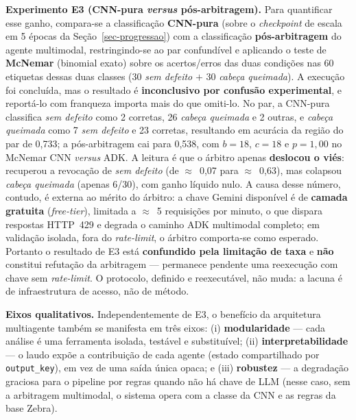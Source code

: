\documentclass[
	article,			%
	11pt,				%
	oneside,			%
	a4paper,			%
	english,			%
	brazilian,			%
	sumario=tradicional
	]{abntex2}
\begin{document}
\noindent\textbf{Experimento E3 (CNN-pura \textit{versus} pós-arbitragem).} Para
quantificar esse ganho, compara-se a classificação \textbf{CNN-pura} (sobre o
\textit{checkpoint} de escala em 5 épocas da Seção~\ref{sec-progressao}) com a
classificação \textbf{pós-arbitragem} do agente
multimodal, restringindo-se ao par confundível e aplicando o teste de
\textbf{McNemar} (binomial exato) \cite{dietterich1998tests} sobre os
acertos/erros das duas condições nas 60 etiquetas dessas duas classes (30
\emph{sem defeito} $+$ 30 \emph{cabeça queimada}). A execução foi concluída, mas
o resultado é \textbf{inconclusivo por confusão experimental}, e reportá-lo com
franqueza importa mais do que omiti-lo. No par, a CNN-pura classifica \emph{sem
defeito} como 2 corretas, 26 \emph{cabeça queimada} e 2 outras, e \emph{cabeça
queimada} como 7 \emph{sem defeito} e 23 corretas, resultando em acurácia da
região do par de 0,733; a pós-arbitragem cai para 0,538, com $b=18$, $c=18$ e
$p=1,00$ no McNemar CNN \textit{versus} ADK. A leitura é que o árbitro apenas
\textbf{deslocou o viés}: recuperou a revocação de \emph{sem defeito} (de
$\approx$~0,07 para $\approx$~0,63), mas colapsou \emph{cabeça queimada} (apenas
6/30), com ganho líquido nulo. A causa desse número, contudo, é externa ao
mérito do árbitro: a chave Gemini disponível é de \textbf{camada gratuita}
(\textit{free-tier}), limitada a $\approx$~5 requisições por minuto, o que dispara
respostas HTTP~429 e degrada o caminho ADK multimodal completo; em validação
isolada, fora do \textit{rate-limit}, o árbitro comporta-se como esperado.
Portanto o resultado de E3 está \textbf{confundido pela limitação de taxa} e
\textbf{não} constitui refutação da arbitragem --- permanece pendente uma
reexecução com chave sem \textit{rate-limit}. O protocolo, definido e
reexecutável, não muda: a lacuna é de infraestrutura de acesso, não de método.

\noindent\textbf{Eixos qualitativos.} Independentemente de E3, o benefício da
arquitetura multiagente também se manifesta em três eixos: (i)
\textbf{modularidade} --- cada análise é uma ferramenta isolada, testável e
substituível; (ii) \textbf{interpretabilidade} --- o laudo expõe a contribuição de
cada agente (estado compartilhado por \texttt{output\_key}), em vez de uma saída
única opaca; e (iii) \textbf{robustez} --- a degradação graciosa para o pipeline por
regras quando não há chave de LLM (nesse caso, sem a arbitragem multimodal, o
sistema opera com a classe da CNN e as regras da base Zebra).
\end{document}
